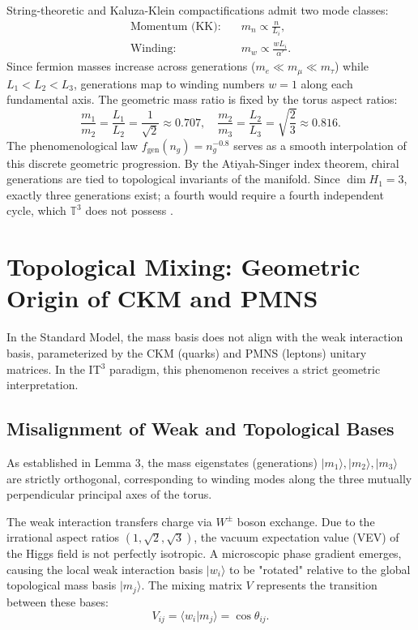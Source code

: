\documentclass[12pt,a4paper]{article}
\begin{document}
String-theoretic and Kaluza-Klein compactifications admit two mode classes:
\begin{align}
    \text{Momentum (KK):} \quad & m_n \propto \frac{n}{L_i}, \\
    \text{Winding:} \quad & m_w \propto \frac{w L_i}{\alpha'}.
\end{align}
Since fermion masses increase across generations ($m_e \ll m_\mu \ll m_\tau$) while $L_1 < L_2 < L_3$, generations map to winding numbers $w=1$ along each fundamental axis. The geometric mass ratio is fixed by the torus aspect ratios:
\begin{equation}
    \frac{m_1}{m_2} = \frac{L_1}{L_2} = \frac{1}{\sqrt{2}} \approx 0.707, \quad \frac{m_2}{m_3} = \frac{L_2}{L_3} = \sqrt{\frac{2}{3}} \approx 0.816.
\end{equation}
The phenomenological law $f_{\text{gen}}(n_g) = n_g^{-0.8}$ serves as a smooth interpolation of this discrete geometric progression. By the Atiyah-Singer index theorem, chiral generations are tied to topological invariants of the manifold. Since $\dim H_1 = 3$, exactly three generations exist; a fourth would require a fourth independent cycle, which $\mathbb{T}^3$ does not possess \cite{Atiyah1963}.

\section{Topological Mixing: Geometric Origin of CKM and PMNS}
In the Standard Model, the mass basis does not align with the weak interaction basis, parameterized by the CKM (quarks) and PMNS (leptons) unitary matrices. In the IT$^3$ paradigm, this phenomenon receives a strict geometric interpretation.

\subsection{Misalignment of Weak and Topological Bases}
As established in Lemma 3, the mass eigenstates (generations) $|m_1\rangle, |m_2\rangle, |m_3\rangle$ are strictly orthogonal, corresponding to winding modes along the three mutually perpendicular principal axes of the torus.

The weak interaction transfers charge via $W^\pm$ boson exchange. Due to the irrational aspect ratios $(1, \sqrt{2}, \sqrt{3})$, the vacuum expectation value (VEV) of the Higgs field is not perfectly isotropic. A microscopic phase gradient emerges, causing the local weak interaction basis $|w_i\rangle$ to be "rotated" relative to the global topological mass basis $|m_j\rangle$. The mixing matrix $V$ represents the transition between these bases:
\begin{equation}
    V_{ij} = \langle w_i | m_j \rangle = \cos \theta_{ij}.
\end{equation}
\end{document}
